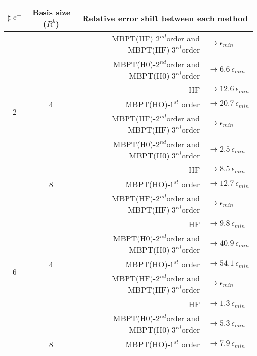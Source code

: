 \documentclass[xcolor=pdftex,hyperref={pdfpagelabels=false},table]{beamer}
\begin{document}
\begin{frame}
\begin{table}
\centering      %
{\tiny
\begin{tabular}[c]{c|c|r l} 
\toprule[1pt]
\multicolumn{1}{c|}{$\sharp \; e^{-}$}  & \multicolumn{1}{c|}{Basis size ($R^b$)} & \multicolumn{2}{c}{Relative error shift between each method}\\
\hline
\multirow{8}{*}{2}&  	& MBPT(HF)-$2^{nd}$order and MBPT(HF)-$3^{rd}$order  & $\rightarrow \epsilon_{min}$ \\
		& 	&    MBPT(H0)-$2^{nd}$order and MBPT(H0)-$3^{rd}$order  & $\rightarrow 6.6 \, \epsilon_{min}$ \\ 
		& 	&    HF							& $\rightarrow 12.6 \, \epsilon_{min}$ \\ 
	& \multirow{-4}{*}{4}	&    MBPT(HO)-$1^{st}$ order		& $\rightarrow 20.7 \, \epsilon_{min}$ \\ \cline{2-4}
		&	& MBPT(HF)-$2^{nd}$order and MBPT(HF)-$3^{rd}$order  & $\rightarrow \epsilon_{min}$ \\ 
		&	&    MBPT(H0)-$2^{nd}$order and MBPT(H0)-$3^{rd}$order  & $\rightarrow 2.5 \, \epsilon_{min}$ \\ 
		&	&    HF							& $\rightarrow 8.5 \, \epsilon_{min}$ \\ 
	& \multirow{-4}{*}{8}	&    MBPT(HO)-$1^{st}$ order		& $\rightarrow 12.7 \, \epsilon_{min}$ \\ \cline{2-4}
\hline
\multirow{8}{*}{6} &	& MBPT(HF)-$2^{nd}$order and MBPT(HF)-$3^{rd}$order  & $\rightarrow \epsilon_{min}$ \\ 
		&	&    HF& $\rightarrow 9.8 \, \epsilon_{min}$ \\ 
		&	&    MBPT(H0)-$2^{nd}$order and MBPT(H0)-$3^{rd}$order  & $\rightarrow 40.9\, \epsilon_{min}$ \\ 
	& \multirow{-4}{*}{4}	&    MBPT(HO)-$1^{st}$ order		& $\rightarrow 54.1 \, \epsilon_{min}$ \\ \cline{2-4}
		&	& MBPT(HF)-$2^{nd}$order and MBPT(HF)-$3^{rd}$order  & $\rightarrow \epsilon_{min}$ \\ 
		&	&    HF& $\rightarrow 1.3 \, \epsilon_{min}$ \\ 
		&	&   MBPT(H0)-$2^{nd}$order and MBPT(H0)-$3^{rd}$order  & $\rightarrow 5.3\, \epsilon_{min}$ \\ 
	& \multirow{-4}{*}{8}	&    MBPT(HO)-$1^{st}$ order		& $\rightarrow 7.9 \, \epsilon_{min}$ \\ \cline{2-4}

\end{tabular}}
\end{table}
\end{frame}
\end{document}
